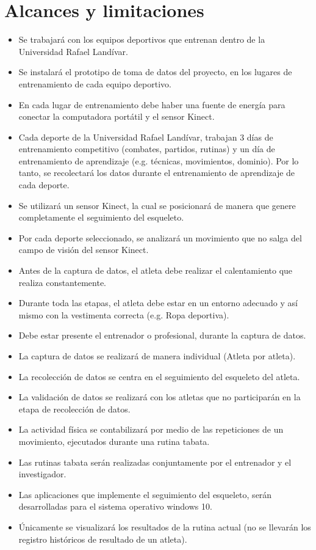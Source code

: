 \section{Alcances y limitaciones}
\begin{itemize}
\item Se trabajar\'a con los equipos deportivos que entrenan dentro de la Universidad Rafael Land\'ivar.
\item Se instalar\'a el prototipo de toma de datos del proyecto, en los lugares de entrenamiento de cada equipo deportivo.
\item En cada lugar de entrenamiento debe haber una fuente de energ\'ia para conectar la computadora port\'atil y el sensor Kinect.
\item Cada deporte de la Universidad Rafael Land\'ivar, trabajan  3 d\'ias de entrenamiento competitivo (combates, partidos, rutinas) y un d\'ia de entrenamiento de aprendizaje (e.g. t\'ecnicas, movimientos, dominio). Por lo tanto, se recolectar\'a los datos durante el entrenamiento de aprendizaje de cada deporte.
\item Se utilizar\'a un sensor Kinect, la cual se posicionar\'a de manera que genere completamente el seguimiento del esqueleto.
\item Por cada deporte seleccionado, se analizar\'a un movimiento que no salga del campo de visi\'on del sensor Kinect.
\item Antes de la captura de datos, el atleta debe realizar el calentamiento que realiza constantemente.
\item Durante toda las etapas, el atleta debe estar en un entorno adecuado y as\'i mismo con la vestimenta correcta (e.g. Ropa deportiva).
\item Debe estar presente el entrenador o profesional, durante la captura de datos.
\item  La captura de datos se realizar\'a de manera individual (Atleta por atleta).
\item  La recolecci\'on de datos se centra en el seguimiento del esqueleto del atleta.
\item La validaci\'on de datos se realizar\'a con los atletas que no participar\'an en la etapa de recolecci\'on de datos.
\item La actividad f\'isica se contabilizar\'a por medio de las repeticiones de un  movimiento, ejecutados durante una rutina tabata.
\item Las rutinas tabata ser\'an realizadas conjuntamente por el entrenador y el investigador.
\item Las aplicaciones que implemente el seguimiento del esqueleto, ser\'an desarrolladas para el sistema operativo windows 10.
\item \'Unicamente se visualizar\'a los resultados de la rutina actual (no se llevar\'an los registro hist\'oricos de resultado de un atleta).
\end{itemize}